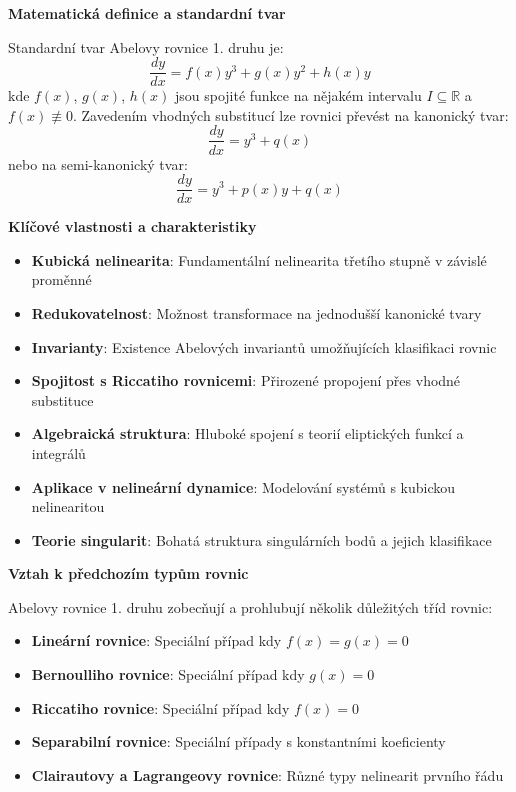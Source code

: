 \vspace{1\baselineskip}

\noindent\textbf{Matematická definice a standardní tvar}

Standardní tvar Abelovy rovnice 1. druhu je:
\[
\frac{dy}{dx} = f(x)y^3 + g(x)y^2 + h(x)y
\]
kde $f(x)$, $g(x)$, $h(x)$ jsou spojité funkce na nějakém intervalu $I \subseteq \mathbb{R}$ a $f(x) \not\equiv 0$. Zavedením vhodných substitucí lze rovnici převést na kanonický tvar:
\[
\frac{dy}{dx} = y^3 + q(x)
\]
nebo na semi-kanonický tvar:
\[
\frac{dy}{dx} = y^3 + p(x)y + q(x)
\]

\vspace{1\baselineskip}

\noindent\textbf{Klíčové vlastnosti a charakteristiky}

\begin{itemize}
\item \textbf{Kubická nelinearita}: Fundamentální nelinearita třetího stupně v závislé proměnné
\item \textbf{Redukovatelnost}: Možnost transformace na jednodušší kanonické tvary
\item \textbf{Invarianty}: Existence Abelových invariantů umožňujících klasifikaci rovnic
\item \textbf{Spojitost s Riccatiho rovnicemi}: Přirozené propojení přes vhodné substituce
\item \textbf{Algebraická struktura}: Hluboké spojení s teorií eliptických funkcí a integrálů
\item \textbf{Aplikace v nelineární dynamice}: Modelování systémů s kubickou nelinearitou
\item \textbf{Teorie singularit}: Bohatá struktura singulárních bodů a jejich klasifikace
\end{itemize}

\vspace{1\baselineskip}

\noindent\textbf{Vztah k předchozím typům rovnic}

Abelovy rovnice 1. druhu zobecňují a prohlubují několik důležitých tříd rovnic:

\begin{itemize}
\item \textbf{Lineární rovnice}: Speciální případ kdy $f(x) = g(x) = 0$
\item \textbf{Bernoulliho rovnice}: Speciální případ kdy $g(x) = 0$
\item \textbf{Riccatiho rovnice}: Speciální případ kdy $f(x) = 0$
\item \textbf{Separabilní rovnice}: Speciální případy s konstantními koeficienty
\item \textbf{Clairautovy a Lagrangeovy rovnice}: Různé typy nelinearit prvního řádu
\end{itemize}

